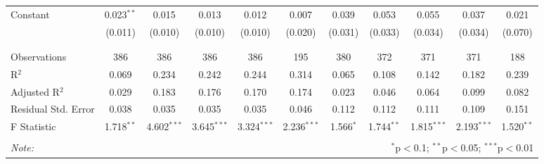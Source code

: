 \begin{table}[H]
\begin{tabular}{@{\extracolsep{4pt}}lcccccccccc}
 Constant & 0.023$^{**}$ & 0.015 & 0.013 & 0.012 & 0.007 & 0.039 & 0.053 & 0.055 & 0.037 & 0.021 \\ 
  & (0.011) & (0.010) & (0.010) & (0.010) & (0.020) & (0.031) & (0.033) & (0.034) & (0.034) & (0.070) \\ 
  & & & & & & & & & & \\ 
\hline \\[-1.8ex] 
Observations & 386 & 386 & 386 & 386 & 195 & 380 & 372 & 371 & 371 & 188 \\ 
R$^{2}$ & 0.069 & 0.234 & 0.242 & 0.244 & 0.314 & 0.065 & 0.108 & 0.142 & 0.182 & 0.239 \\ 
Adjusted R$^{2}$ & 0.029 & 0.183 & 0.176 & 0.170 & 0.174 & 0.023 & 0.046 & 0.064 & 0.099 & 0.082 \\ 
Residual Std. Error & 0.038 & 0.035 & 0.035 & 0.035 & 0.046 & 0.112 & 0.112 & 0.111 & 0.109 & 0.151 \\ 
F Statistic & 1.718$^{**}$ & 4.602$^{***}$ & 3.645$^{***}$ & 3.324$^{***}$ & 2.236$^{***}$ & 1.566$^{*}$ & 1.744$^{**}$ & 1.815$^{***}$ & 2.193$^{***}$ & 1.520$^{**}$ \\ 
\hline 
\hline \\[-1.8ex] 
\textit{Note:}  & \multicolumn{10}{r}{$^{*}$p$<$0.1; $^{**}$p$<$0.05; $^{***}$p$<$0.01} \\ 
\end{tabular} 
\end{table} 
